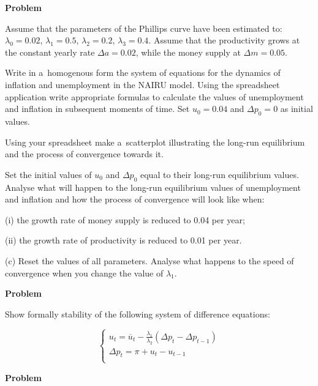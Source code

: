 \documentclass[a4paper, notitlepage, 11pt]{article}
\newcounter{zadlicz}[section]%
\newcommand{\tytul}[2]{\setcounter{equation}{0}\addtocounter{zadlicz}{1}\vspace{\abovedisplayskip}\noindent\textbf{#1\ \thezadlicz #2}}%
\begin{document}
\tytul{Problem}{}

\noindent%
Assume that the parameters of the Phillips curve have been estimated to: $\lambda_0=0.02$, $\lambda_1=0.5$, $\lambda_2=0.2$, $\lambda_3=0.4$. Assume that the productivity grows at the constant yearly rate $\Delta a=0.02$, while the money supply at $\Delta m=0.05$.

Write in a~homogenous form the system of equations for the dynamics of inflation and unemployment in the NAIRU model. Using the spreadsheet application write appropriate formulas to calculate the values of unemployment and inflation in subsequent moments of time. Set $u_0=0.04$ and $\Delta p_0=0$ as initial values.

\begin{wylicz}
\item Using your spreadsheet make a~scatterplot illustrating the long-run equilibrium and the process of convergence towards it.
\item Set the initial values of $u_0$ and $\Delta p_0$ equal to their long-run equilibrium values. Analyse what will happen to the long-run equilibrium values of unemployment and inflation and how the process of convergence will look like when:
    \begin{wylicz}
      \item[(i)] the growth rate of money supply is reduced to 0.04 per year;
      \item[(ii)] the growth rate of productivity is reduced to 0.01 per year.
    \end{wylicz}
\item[(c)] Reset the values of all parameters. Analyse what happens to the speed of convergence when you change the value of $\lambda_1$.
\end{wylicz}

\tytul{Problem}{}

\noindent%
Show formally stability of the following system of difference equations:

\[
\left\{%
\begin{array}{l}
    u_t = \overline{u}_t-\frac{\lambda_1}{\lambda_2}(\Delta p_t-\Delta p_{t-1}) \\
    \Delta p_t = \pi + u_t - u_{t-1} \\
\end{array}%
\right.
\]


\tytul{Problem}{}
\end{document}

